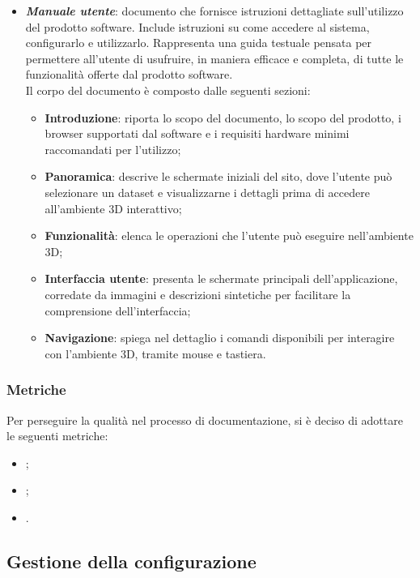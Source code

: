 \begin{itemize}
      \item \textit{\textbf{Manuale utente}}: documento che fornisce istruzioni dettagliate sull'utilizzo del prodotto software. Include istruzioni su come accedere al sistema, configurarlo e utilizzarlo. Rappresenta una guida testuale pensata per permettere all’utente di usufruire, in maniera efficace e completa, di tutte le funzionalità offerte dal prodotto software.\\
      Il corpo del documento è composto dalle seguenti sezioni:
            \begin{itemize}
                  \item \textbf{Introduzione}: riporta lo scopo del documento, lo scopo del prodotto, i browser supportati dal software e i requisiti hardware minimi raccomandati per l’utilizzo;
                  \item \textbf{Panoramica}: descrive le schermate iniziali del sito, dove l’utente può selezionare un dataset e visualizzarne i dettagli prima di accedere all’ambiente 3D interattivo;
                  \item \textbf{Funzionalità}: elenca le operazioni che l’utente può eseguire nell’ambiente 3D;
                  \item \textbf{Interfaccia utente}: presenta le schermate principali dell’applicazione, corredate da immagini e descrizioni sintetiche per facilitare la comprensione dell’interfaccia;
                  \item \textbf{Navigazione}: spiega nel dettaglio i comandi disponibili per interagire con l’ambiente 3D, tramite mouse e tastiera.
                 
            \end{itemize}
\end{itemize}

\subsubsection{Metriche}
Per perseguire la qualità nel processo di documentazione, si è deciso di
adottare le seguenti metriche:
\begin{itemize}
      \item {};
      \item {};
      \item {}.
\end{itemize}

\subsection{Gestione della configurazione}

